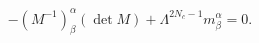 \begin{equation}
  [(M^{-1})^{\alpha}_{{\beta}} \tilde{b}^{{\beta}} ]
  [b_{\gamma} (M^{-1})^{\gamma}_{{\beta}}] - (M^{-1})^{\alpha}_{{\beta}}
  (\det M) + \Lambda^{2N_c-1} m^{\alpha}_{{\beta}} = 0.
\end{equation}

